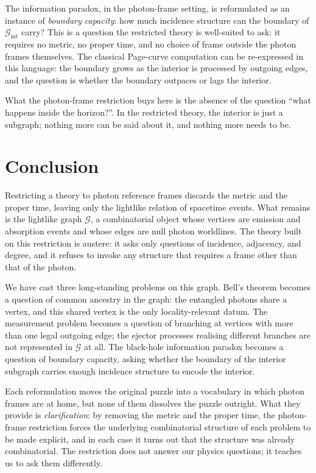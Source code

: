 \documentclass[11pt]{article}
\begin{document}
The information paradox, in the photon-frame setting, is reformulated as an instance of \emph{boundary capacity}: how much incidence structure can the boundary of $\mathcal{G}_{\mathrm{int}}$ carry? This is a question the restricted theory is well-suited to ask: it requires no metric, no proper time, and no choice of frame outside the photon frames themselves. The classical Page-curve computation can be re-expressed in this language: the boundary grows as the interior is processed by outgoing edges, and the question is whether the boundary outpaces or lags the interior.

What the photon-frame restriction buys here is the absence of the question ``what happens inside the horizon?''. In the restricted theory, the interior is just a subgraph; nothing more can be said about it, and nothing more needs to be.

\section{Conclusion}
\label{sec:conclusion}

Restricting a theory to photon reference frames discards the metric and the proper time, leaving only the lightlike relation of spacetime events. What remains is the lightlike graph $\mathcal{G}$, a combinatorial object whose vertices are emission and absorption events and whose edges are null photon worldlines. The theory built on this restriction is austere: it asks only questions of incidence, adjacency, and degree, and it refuses to invoke any structure that requires a frame other than that of the photon.

We have cast three long-standing problems on this graph. Bell's theorem becomes a question of common ancestry in the graph: the entangled photons share a vertex, and this shared vertex is the only locality-relevant datum. The measurement problem becomes a question of branching at vertices with more than one legal outgoing edge; the ejector processes realising different branches are not represented in $\mathcal{G}$ at all. The black-hole information paradox becomes a question of boundary capacity, asking whether the boundary of the interior subgraph carries enough incidence structure to encode the interior.

Each reformulation moves the original puzzle into a vocabulary in which photon frames are at home, but none of them dissolves the puzzle outright. What they provide is \emph{clarification}: by removing the metric and the proper time, the photon-frame restriction forces the underlying combinatorial structure of each problem to be made explicit, and in each case it turns out that the structure was already combinatorial. The restriction does not answer our physics questions; it teaches us to ask them differently.
\end{document}
